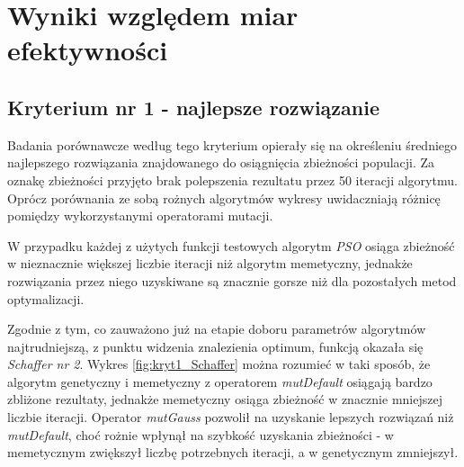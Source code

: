 \FloatBarrier

\section{Wyniki względem miar efektywności}
\subsection{Kryterium nr 1 - najlepsze rozwiązanie}

\par
Badania porównawcze według tego kryterium opierały się na określeniu średniego najlepszego rozwiązania znajdowanego do osiągnięcia zbieżności populacji. Za oznakę zbieżności przyjęto brak polepszenia rezultatu przez 50 iteracji algorytmu. Oprócz porównania ze sobą rożnych algorytmów wykresy uwidaczniają różnicę pomiędzy wykorzystanymi operatorami mutacji. 
\par
W przypadku każdej z użytych funkcji testowych algorytm \emph{PSO} osiąga zbieżność w nieznacznie większej liczbie iteracji niż algorytm memetyczny, jednakże rozwiązania przez niego uzyskiwane są znacznie gorsze niż dla pozostałych metod optymalizacji. 
\par 
Zgodnie z tym, co zauważono już na etapie doboru parametrów algorytmów  najtrudniejszą, z punktu widzenia znalezienia optimum, funkcją okazała się \emph{Schaffer nr 2}. Wykres \ref{fig:kryt1_Schaffer} można rozumieć w taki sposób, że algorytm genetyczny i memetyczny z operatorem \emph{mutDefault} osiągają bardzo zbliżone rezultaty, jednakże memetyczny osiąga zbieżność w znacznie mniejszej liczbie iteracji. Operator \emph{mutGauss} pozwolił na uzyskanie lepszych rozwiązań niż \emph{mutDefault}, choć rożnie wpłynął na szybkość uzyskania zbieżności - w memetycznym zwiększył liczbę potrzebnych iteracji, a w genetycznym zmniejszył. 


